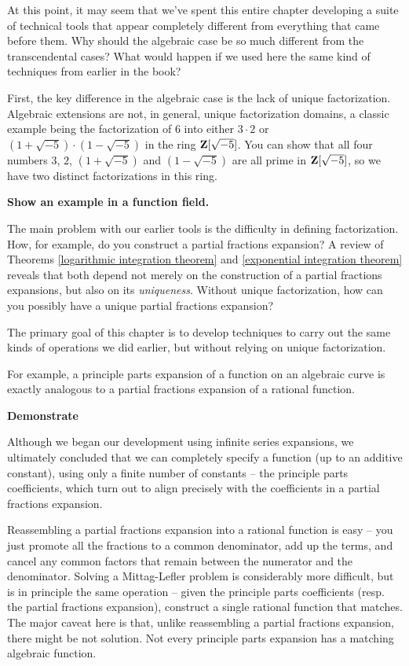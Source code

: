 
At this point, it may seem that we've spent this entire chapter
developing a suite of technical tools that appear completely different
from everything that came before them.  Why should the algebraic case
be so much different from the transcendental cases?  What would happen
if we used here the same kind of techniques from earlier in the book?

First, the key difference in the algebraic case is the lack of unique
factorization.  Algebraic extensions are not, in general, unique
factorization domains, a classic example being the factorization of
$6$ into either $3\cdot 2$ or $(1+\sqrt{-5})\cdot(1-\sqrt{-5})$ in the
ring $\mathbf{Z}[\sqrt{-5}]$.  You can show that all four numbers $3$, $2$,
$(1+\sqrt{-5})$ and $(1-\sqrt{-5})$ are all prime in $\mathbf{Z}[\sqrt{-5}]$,
so we have two distinct factorizations in this ring.

{\bf Show an example in a function field.}

The main problem with our earlier tools is the difficulty in defining
factorization.  How, for example, do you construct a partial fractions
expansion?  A review of Theorems \ref{logarithmic integration theorem}
and \ref{exponential integration theorem} reveals that both depend
not merely on the construction of a partial fractions expansions, but
also on its {\it uniqueness}.  Without unique factorization, how can
you possibly have a unique partial fractions expansion?

The primary goal of this chapter is to develop techniques to carry
out the same kinds of operations we did earlier, but without relying
on unique factorization.

For example, a principle parts expansion of a function on an algebraic
curve is exactly analogous to a partial fractions expansion of a
rational function.

{\bf Demonstrate}

Although we began our development using infinite series expansions, we
ultimately concluded that we can completely specify a function (up to
an additive constant), using only a finite number of constants -- the
principle parts coefficients, which turn out to align precisely with
the coefficients in a partial fractions expansion.

Reassembling a partial fractions expansion into a rational function is
easy -- you just promote all the fractions to a common denominator,
add up the terms, and cancel any common factors that remain between
the numerator and the denominator.  Solving a Mittag-Lefler problem is
considerably more difficult, but is in principle the same operation --
given the principle parts coefficients (resp. the partial fractions
expansion), construct a single rational function that matches.  The
major caveat here is that, unlike reassembling a partial fractions
expansion, there might be not solution.  Not every principle parts
expansion has a matching algebraic function.

